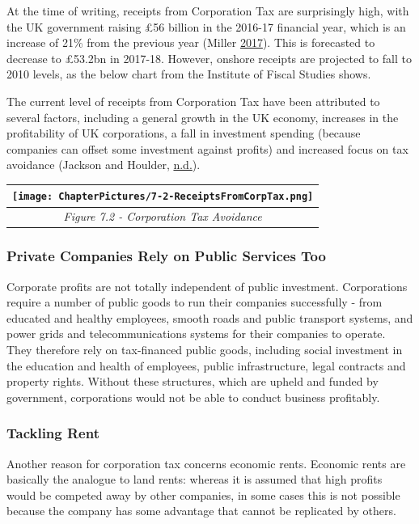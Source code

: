 \documentclass[]{tufte-handout}
\begin{document}
At the time of writing, receipts from Corporation Tax are surprisingly
high, with the UK government raising £56 billion in the 2016-17
financial year, which is an increase of 21\% from the previous year
(Miller \protect\hyperlink{ref-Miller2017}{2017}). This is forecasted to
decrease to £53.2bn in 2017-18. However, onshore receipts are projected
to fall to 2010 levels, as the below chart from the Institute of Fiscal
Studies shows.

The current level of receipts from Corporation Tax have been attributed
to several factors, including a general growth in the UK economy,
increases in the profitability of UK corporations, a fall in investment
spending (because companies can offset some investment against profits)
and increased focus on tax avoidance (Jackson and Houlder,
\protect\hyperlink{ref-JacksonHoulder}{n.d.}).

\begin{longtable}[]{@{}c@{}}
\toprule
\texttt{[image: ChapterPictures/7-2-ReceiptsFromCorpTax.png]}\tabularnewline
\midrule
\endhead
\emph{Figure 7.2 - Corporation Tax Avoidance}\tabularnewline
\bottomrule
\end{longtable}

\hypertarget{private-companies-rely-on-public-services-too}{%
\subsubsection{Private Companies Rely on Public Services
Too}\label{private-companies-rely-on-public-services-too}}

Corporate profits are not totally independent of public investment.
Corporations require a number of public goods to run their companies
successfully - from educated and healthy employees, smooth roads and
public transport systems, and power grids and telecommunications systems
for their companies to operate. They therefore rely on tax-financed
public goods, including social investment in the education and health of
employees, public infrastructure, legal contracts and property rights.
Without these structures, which are upheld and funded by government,
corporations would not be able to conduct business profitably.

\hypertarget{tackling-rent}{%
\subsubsection{Tackling Rent}\label{tackling-rent}}

Another reason for corporation tax concerns economic rents. Economic
rents are basically the analogue to land rents: whereas it is assumed
that high profits would be competed away by other companies, in some
cases this is not possible because the company has some advantage that
cannot be replicated by others.
\end{document}
